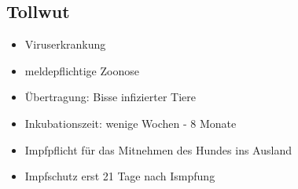     \subsection{Tollwut}
    \begin{itemize}
        \item Viruserkrankung
        \item meldepflichtige Zoonose
        \item Übertragung: Bisse infizierter Tiere
        \item Inkubationszeit: wenige Wochen - 8 Monate
        \item Impfpflicht für das Mitnehmen des Hundes ins Ausland
        \item Impfschutz erst 21 Tage nach Ismpfung
    \end{itemize}